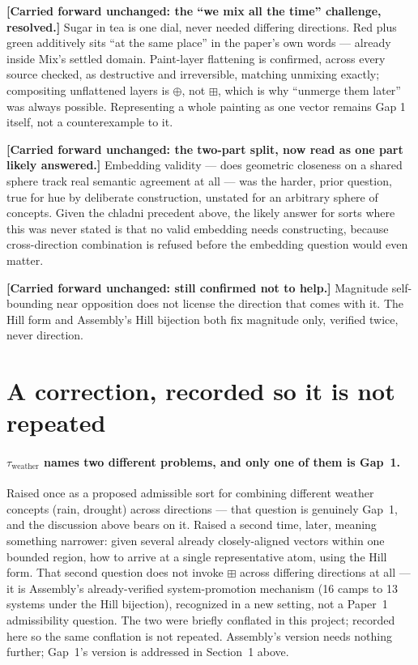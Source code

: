 \documentclass[11pt]{article}
\begin{document}
\textbf{[Carried forward unchanged: the ``we mix all the time''
challenge, resolved.]} Sugar in tea is one dial, never needed
differing directions. Red plus green additively sits ``at the same
place'' in the paper's own words --- already inside Mix's settled
domain. Paint-layer flattening is confirmed, across every source
checked, as destructive and irreversible, matching unmixing exactly;
compositing unflattened layers is $\oplus$, not $\boxplus$, which is
why ``unmerge them later'' was always possible. Representing a whole
painting as one vector remains Gap 1 itself, not a counterexample to
it.

\textbf{[Carried forward unchanged: the two-part split, now read as
one part likely answered.]} Embedding validity --- does geometric
closeness on a shared sphere track real semantic agreement at all ---
was the harder, prior question, true for hue by deliberate
construction, unstated for an arbitrary sphere of concepts. Given the
chladni precedent above, the likely answer for sorts where this was
never stated is that no valid embedding needs constructing, because
cross-direction combination is refused before the embedding question
would even matter.

\textbf{[Carried forward unchanged: still confirmed not to help.]}
Magnitude self-bounding near opposition does not license the
direction that comes with it. The Hill form and Assembly's Hill
bijection both fix magnitude only, verified twice, never direction.

\section{A correction, recorded so it is not repeated}

\paragraph{$\tau_{\text{weather}}$ names two different problems, and
only one of them is Gap~1.} Raised once as a proposed admissible sort
for combining different weather concepts (rain, drought) across
directions --- that question is genuinely Gap~1, and the discussion
above bears on it. Raised a second time, later, meaning something
narrower: given several already closely-aligned vectors within one
bounded region, how to arrive at a single representative atom, using
the Hill form. That second question does not invoke $\boxplus$ across
differing directions at all --- it is Assembly's already-verified
system-promotion mechanism (16 camps to 13 systems under the Hill
bijection), recognized in a new setting, not a Paper~1 admissibility
question. The two were briefly conflated in this project; recorded
here so the same conflation is not repeated. Assembly's version needs
nothing further; Gap~1's version is addressed in Section~1 above.
\end{document}

